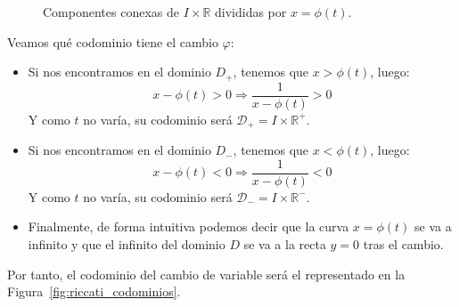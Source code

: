 \begin{figure}[H]
\centering
{}
\caption{Componentes conexas de $I\times \mathbb{R}$ divididas por $x=\phi(t)$.}
\label{fig:riccati_dominios}
\end{figure}
Veamos qué codominio tiene el cambio $\varphi$:
\begin{itemize}
    \item Si nos encontramos en el dominio $D_+$, tenemos que $x>\phi(t)$, luego:
        \begin{equation*}
            x-\phi(t) > 0 \Longrightarrow \dfrac{1}{x-\phi(t)} > 0
        \end{equation*}
        Y como $t$ no varía, su codominio será $\mathcal{D}_+=I\times \mathbb{R}^+$.
    \item Si nos encontramos en el dominio $D_-$, tenemos que $x<\phi(t)$, luego:
        \begin{equation*}
            x-\phi(t) < 0 \Longrightarrow \dfrac{1}{x-\phi(t)} < 0
        \end{equation*}
        Y como $t$ no varía, su codominio será $\mathcal{D}_-=I\times \mathbb{R}^-$.
    \item Finalmente, de forma intuitiva podemos decir que la curva $x=\phi(t)$ se va a infinito y que el infinito del dominio $D$ se va a la recta $y=0$ tras el cambio.
\end{itemize}
Por tanto, el codominio del cambio de variable será el representado en la Figura~\ref{fig:riccati_codominios}.
